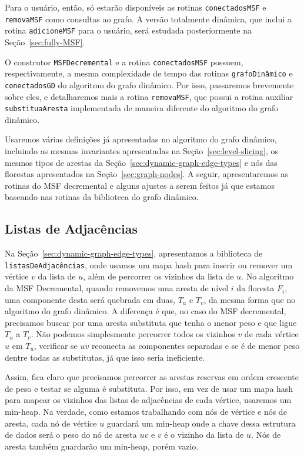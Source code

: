 Para o usuário, então, só estarão disponíveis as rotinas \texttt{conectadosMSF} e \texttt{removaMSF} como consultas ao grafo. A versão totalmente dinâmica, que inclui a rotina \texttt{adicioneMSF} para o usuário, será estudada posteriormente na Seção~\ref{sec:fully-MSF}.

O construtor \texttt{MSFDecremental} e a rotina \texttt{conectadosMSF} possuem, respectivamente, a mesma complexidade de tempo das rotinas \texttt{grafoDinâmico} e \texttt{conectadosGD} do algoritmo do grafo dinâmico. Por isso, passaremos brevemente sobre eles, e detalharemos mais a rotina \texttt{removaMSF}, que possui a rotina auxiliar \texttt{substituaAresta} implementada de maneira diferente do algoritmo do grafo dinâmico. 

Usaremos várias definições já apresentadas no algoritmo do grafo dinâmico, incluindo as mesmas invariantes apresentadas na Seção~\ref{sec:level-slicing}, os mesmos tipos de arestas da Seção~\ref{sec:dynamic-graph-edge-types} e nós das florestas apresentados na Seção~\ref{sec:graph-nodes}. A seguir, apresentaremos as rotinas do MSF decremental e alguns ajustes a serem feitos já que estamos baseando nas rotinas da biblioteca do grafo dinâmico. 

\subsection{Listas de Adjacências}
\label{sec:adjancency-lists-min-heap}

Na Seção~\ref{sec:dynamic-graph-edge-types}, apresentamos a biblioteca de \texttt{listasDeAdjacências}, onde usamos um mapa hash para inserir ou remover um vértice $v$ da lista de $u$, além de percorrer os vizinhos da lista de $u$. No algoritmo da MSF Decremental, quando removemos uma aresta de nível $i$ da floresta $F_i$, uma componente desta será quebrada em duas, $T_u$ e $T_v$, da mesma forma que no algoritmo do grafo dinâmico. A diferença é que, no caso do MSF decremental, precisamos buscar por uma aresta substituta que tenha o menor peso e que ligue $T_u$ a $T_v$. Não podemos simplesmente percorrer todos os vizinhos $v$ de cada vértice $u$ em $T_u$, verificar se $uv$ reconecta as componentes separadas e se é de menor peso dentre todas as substitutas, já que isso seria ineficiente.

Assim, fica claro que precisamos percorrer as arestas reservas em ordem crescente de peso e testar se alguma é substituta. Por isso, em vez de usar um mapa hash para mapear os vizinhos das listas de adjacências de cada vértice, usaremos um min-heap. Na verdade, como estamos trabalhando com nós de vértice e nós de aresta, cada nó de vértice $u$ guardará um min-heap onde a chave dessa estrutura de dados será o peso do nó de aresta $uv$ e $v$ é o vizinho da lista de $u$. Nós de aresta também guardarão um min-heap, porém vazio. 

